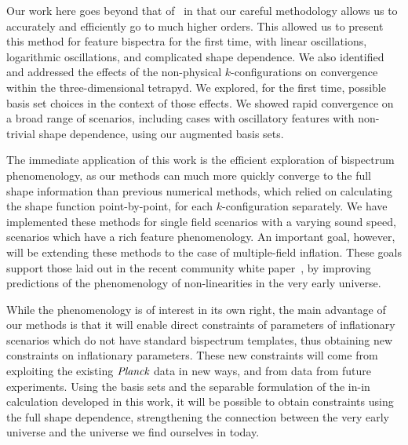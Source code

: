 Our work here goes beyond that of~\cite{Funakoshi} in that our careful methodology
allows us to accurately and efficiently go to much higher orders.
This allowed us to present this method for feature bispectra for the first time,
with linear oscillations, logarithmic oscillations, and complicated shape dependence.
We also identified and addressed the effects
of the non-physical $k$-configurations on convergence within the three-dimensional tetrapyd.
We explored, for the first time, possible basis set choices in the context of those effects.
We showed rapid convergence on a broad range of scenarios,
including cases with oscillatory features with non-trivial shape dependence,
using our augmented basis sets.


The immediate application of this work is the efficient exploration of
bispectrum phenomenology, as our methods can much more quickly
converge to the full shape information than previous numerical methods,
which relied on calculating the shape function point-by-point, for each $k$-configuration separately.
We have implemented these methods for single field scenarios
with a varying sound speed, scenarios which
have a rich feature phenomenology. An important goal, however, will be extending
these methods to the case of multiple-field inflation.
These goals support those laid out in the recent community white paper~\cite{astro2020_png},
by improving predictions of the phenomenology of non-linearities in the very early universe.

While the phenomenology is of interest in its own right,
the main advantage of our methods is that it will enable
direct constraints of parameters of inflationary scenarios which do not have
standard bispectrum templates, thus obtaining new constraints on inflationary parameters.
These new constraints will come from exploiting the existing $\textit{Planck}$ data in
new ways, and from data from future experiments.
Using the basis sets and the separable formulation of the in-in calculation developed in this work,
it will be possible to obtain constraints using the full shape dependence,
strengthening the connection between the very early universe and the universe we
find ourselves in today.
